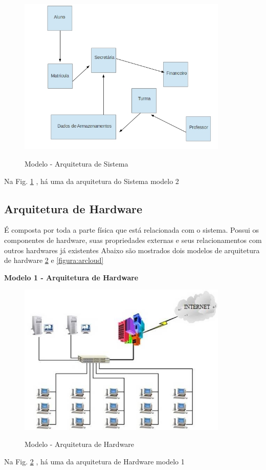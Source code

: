                 
                  \begin{figure}[H]
                 \caption{Modelo - Arquitetura de Sistema}
               \centering %
                \includegraphics[width=10cm]{analisedeProjeto/modelo2Arquitetura} %
                \label{figura:modelo2Arquitetura}
                \end{figure}
                Na Fig. \ref{figura:modelo2Arquitetura} , há uma da arquitetura do Sistema modelo 2


                
                  \subsection{Arquitetura de Hardware}
  
 
É composta por toda a parte física que está relacionada com o sistema. Possui os componentes de hardware, suas propriedades externas e seus relacionamentos com outros hardwares já existentes
Abaixo são mostrados dois modelos de arquitetura de hardware   \ref{figura:arquiteturaDeHardware} e \ref{figura:arcloud}
  
   \textbf{Modelo 1 - Arquitetura de Hardware }
  
       \begin{figure}[H]
                 \caption{Modelo - Arquitetura de Hardware}
               \centering %
                \includegraphics[width=10cm]{analisedeProjeto/arquiteturaDeHardware} %
                \label{figura:arquiteturaDeHardware}
                \end{figure}
                Na Fig. \ref{figura:arquiteturaDeHardware} , há uma da arquitetura de Hardware modelo 1
                
